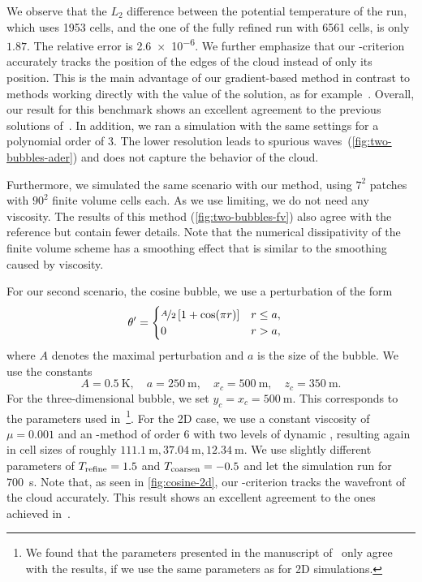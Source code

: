 \documentclass[runningheads]{llncs}
\begin{document}
We observe that the $L_2$ difference between the potential temperature of the \amr{} run, which uses 1953 cells, and the one of the fully refined run with 6561 cells, is only $1.87$.
The relative error is \num{2.6e-6}.
We further emphasize that our \amr{}-criterion accurately tracks the position of the edges of the cloud instead of only its position.
This is the main advantage of our gradient-based method in contrast to methods working directly with the value of the solution, as for example~\cite{muller2010adaptive}.
Overall, our result for this benchmark shows an excellent agreement to the previous solutions of~\cite{muller2010adaptive}.
In addition, we ran a simulation with the same settings for a polynomial order of 3.
The lower resolution leads to spurious waves~(\cref{fig:two-bubbles-ader}) and does not capture the behavior of the cloud.

Furthermore, we simulated the same scenario with our \muscl{} method, using $7^2$ patches with $90^2$ finite volume cells each.
As we use limiting, we do not need any viscosity.
The results of this method (\cref{fig:two-bubbles-fv}) also agree with the reference but contain fewer details.
Note that the numerical dissipativity of the finite volume scheme has a smoothing effect that is similar to the smoothing caused by viscosity.

For our second scenario, the cosine bubble, we use a perturbation of the form
\begin{align}
  \label{eq:cos-pertubation}
  \theta' &= \begin{cases}
    \nicefrac{A}{2} \left[ 1 + \cos(\pi r) \right] & r \leq a, \\
    0 & r > a,
    \end{cases}
\end{align}
where $A$ denotes the maximal perturbation and $a$ is the size of the bubble.
We use the constants
\begin{equation}\label{eq:cosine-bubble}
  A = \SI{0.5}{\K}, \quad a = \SI{250}{\m}, \quad x_c = \SI{500}{\m}, \quad z_c = \SI{350}{\m}.
\end{equation}
For the three-dimensional bubble, we set $y_c = x_c = \SI{500}{\m}$.
This corresponds to the parameters used in~\cite{kelly2012continuous}\footnote{%
We found that the parameters presented in the manuscript of~\cite{kelly2012continuous} only agree with the results, if we use the same parameters as for 2D simulations.}.
For the 2D case, we use a constant viscosity of $\mu = 0.001$ and an \aderdg{}-method of order 6 with two levels of dynamic \amr{}, resulting again in cell sizes of roughly $\SI{111.1}{\m}, \SI{37.04}{\m}, \SI{12.34}{\m}$.
We use slightly different \amr{} parameters of $T_\text{refine} = 1.5$ and $T_\text{coarsen} = -0.5$ and let the simulation run for \SI{700}{\s}.
Note that, as seen in \cref{fig:cosine-2d}, our \amr{}-criterion tracks the wavefront of the cloud accurately.
This result shows an excellent agreement to the ones achieved in~\cite{giraldo2008study,muller2010adaptive}.
\end{document}
